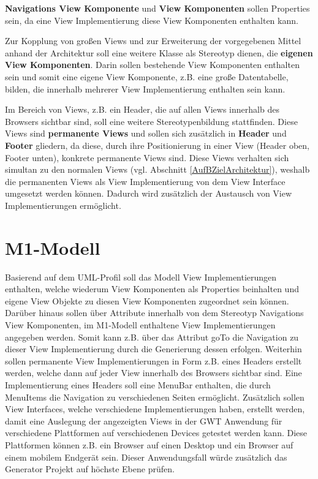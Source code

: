 \textbf{Navigations View Komponente} und \textbf{View Komponenten} sollen 
Properties sein, da eine View Implementierung diese View Komponenten enthalten
kann.

Zur Kopplung von großen Views und zur Erweiterung der vorgegebenen Mittel anhand
der Architektur soll eine weitere Klasse als Stereotyp dienen, die
\textbf{eigenen View Komponenten}. Darin sollen bestehende View Komponenten
enthalten sein und somit eine eigene View Komponente, z.B. eine große
Datentabelle, bilden, die innerhalb mehrerer View Implementierung enthalten sein
kann.

Im Bereich von Views, z.B. ein Header, die auf allen Views innerhalb des
Browsers sichtbar sind, soll eine weitere Stereotypenbildung stattfinden. Diese Views
sind \textbf{permanente Views} und sollen sich zusätzlich in \textbf{Header} und
\textbf{Footer} gliedern, da diese, durch
ihre Positionierung in einer View (Header oben, Footer unten), konkrete
permanente Views sind. Diese Views verhalten sich simultan zu den normalen Views (vgl. Abschnitt \ref{AufBZielArchitektur}),
weshalb die permanenten Views als View Implementierung von dem View Interface umgesetzt werden können.
Dadurch wird zusätzlich der Austausch von View Implementierungen ermöglicht.
\section{M1-Modell}\label{AufBM1}
Basierend auf dem UML-Profil soll das Modell View Implementierungen enthalten,
welche wiederum View Komponenten als Properties beinhalten und eigene
View Objekte zu diesen View Komponenten zugeordnet sein können. Darüber hinaus
sollen über Attribute innerhalb von dem Stereotyp Navigations View Komponenten,
im M1-Modell enthaltene View Implementierungen angegeben werden. Somit kann z.B. über das Attribut goTo
die Navigation zu dieser View Implementierung durch die Generierung
dessen erfolgen.
Weiterhin sollen permanente View Implementierungen in Form z.B. eines
Headers erstellt werden, welche dann auf jeder View innerhalb des Browsers
sichtbar sind. Eine Implementierung eines Headers soll eine MenuBar enthalten,
die durch MenuItems die Navigation zu verschiedenen Seiten ermöglicht.
Zusätzlich sollen View Interfaces, welche verschiedene
Implementierungen haben, erstellt werden, damit eine Auslegung der
angezeigten Views in der GWT Anwendung für verschiedene Plattformen auf
verschiedenen Devices getestet werden kann. Diese Plattformen können z.B.
ein Browser auf einen Desktop und ein Browser auf einem mobilem Endgerät sein.
Dieser Anwendungsfall würde zusätzlich das Generator Projekt auf höchste Ebene 
prüfen.
